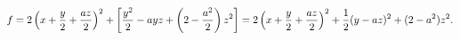 \documentclass[preview]{standalone}
\begin{document}
\begin{align*}
\special{dvisvgm:raw <g id='unique000'>}f=2\left(x+\frac{y}{2}+\frac{az}{2}\right)^2+\left[\frac{y^2}{2}-ayz+\left(2-\frac{a^2}{2}\right)z^2\right]=2\left(x+\frac{y}{2}+\frac{az}{2}\right)^2+\frac{1}{2}(y-az)^2+(2-a^2)z^2.\special{dvisvgm:raw </g>}
\end{align*}
\end{document}
